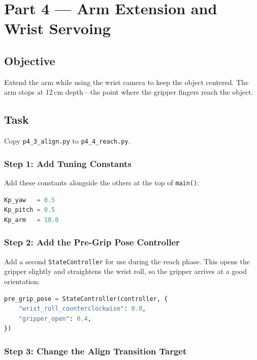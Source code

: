\documentclass[11pt,a4paper]{article}
\begin{document}
\newpage

\section*{Part 4 --- Arm Extension and Wrist Servoing}

\subsection*{Objective}

Extend the arm while using the wrist camera to keep the object centered. The arm stops at 12\,cm depth---the point where the gripper fingers reach the object.

\subsection*{Task}

Copy \texttt{p4\_3\_align.py} to \texttt{p4\_4\_reach.py}.

\subsubsection*{Step 1: Add Tuning Constants}

Add these constants alongside the others at the top of \texttt{main()}:

\begin{lstlisting}[language=Python]
Kp_yaw   = 0.5
Kp_pitch = 0.5
Kp_arm   = 10.0
\end{lstlisting}

\subsubsection*{Step 2: Add the Pre-Grip Pose Controller}

Add a second \texttt{StateController} for use during the reach phase. This opens the gripper slightly and straightens the wrist roll, so the gripper arrives at a good orientation:

\begin{lstlisting}[language=Python]
pre_grip_pose = StateController(controller, {
    "wrist_roll_counterclockwise": 0.0,
    "gripper_open": 0.4,
})
\end{lstlisting}

\subsubsection*{Step 3: Change the Align Transition Target}
\end{document}
